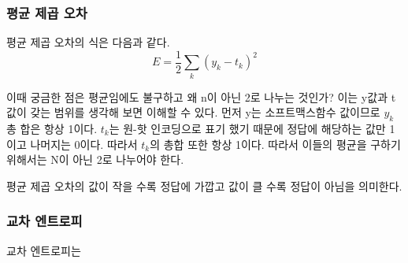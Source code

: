 \documentclass[12pt]{article}
\begin{document}
\subsubsection{평균 제곱 오차}
평균 제곱 오차의 식은 다음과 같다.
\[ E = \frac{1}{2} \sum_{k}(y_{k} - t_{k})^2  \]

이때 궁금한 점은 평균임에도 불구하고 왜 n이 아닌 2로 나누는 것인가? 이는 y값과 t값이 갖는 범위를 생각해 보면 이해할 수 있다. 먼저 y는 소프트맥스함수 값이므로 $y_{k}$ 총 합은 항상 1이다.
$t_{k}$는 원-핫 인코딩으로 표기 했기 때문에 정답에 해당하는 값만 1이고 나머지는 0이다. 따라서 $t_{k}$의 총합 또한 항상 1이다. 따라서 이들의 평균을 구하기 위해서는 N이 아닌 2로 나누어야 한다.

평균 제곱 오차의 값이 작을 수록 정답에 가깝고 값이 클 수록 정답이 아님을 의미한다.
\subsubsection{교차 엔트로피}
교차 엔트로피는 
\end{document}
